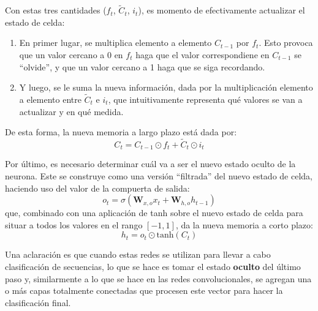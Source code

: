 \documentclass[../../main.tex]{subfiles}
\begin{document}
Con estas tres cantidades (\(f_t\), \(\tilde{C}_t\), \(i_t\)), es momento de
efectivamente actualizar el estado de celda:
\begin{enumerate}
    \item En primer lugar, se multiplica elemento a elemento \(C_{t-1}\) por \(f_t\). Esto
    provoca que un valor cercano a 0 en \(f_t\) haga que el valor correspondiene en
    \(C_{t-1}\) se ``olvide'', y que un valor cercano a 1 haga que se siga recordando.
    \item Y luego, se le suma la nueva información, dada por la multiplicación
    elemento a elemento entre \(\tilde{C}_t\) e \(i_t\), que intuitivamente representa qué
    valores se van a actualizar y en qué medida.
\end{enumerate}
De esta forma, la nueva memoria a largo plazo está dada por:
\[
    C_t = C_{t-1} \odot f_t + \tilde{C}_t \odot i_t
\]

Por último, es necesario determinar cuál va a ser el nuevo estado oculto de la neurona.
Este se construye como una versión ``filtrada'' del nuevo estado de celda, haciendo
uso del valor de la compuerta de salida:
\[
    o_t = \sigma \left( \bm{W}_{x,o} x_t + \bm{W}_{h,o} h_{t-1} \right)
\]
que, combinado con una aplicación de tanh sobre el nuevo estado de celda para situar a
todos los valores en el rango \([-1,1]\), da la nueva memoria a corto plazo:
\[
    h_t = o_t \odot \text{tanh}(C_t)
\]

\bigskip
Una aclaración es que cuando estas redes se utilizan para llevar a cabo clasificación
de secuencias, lo que se hace es tomar el estado \textbf{oculto} del último paso y,
similarmente a lo que se hace en las redes convolucionales, se agregan una o más capas
totalmente conectadas que procesen este vector para hacer la clasificación final.
\end{document}
